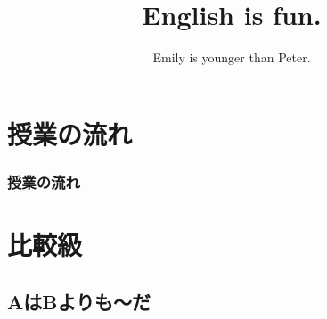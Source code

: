 \documentclass[aspectratio=169,xcolor={dvipsnames,table}]{beamer}
\title{English is fun.}
\subtitle{Emily is younger than Peter.}
\author{}
\institute[]{}
\date[]
\begin{document}
\begin{frame}[plain]
  \titlepage
\end{frame}

\section*{授業の流れ}
\begin{frame}[plain]
  \frametitle{授業の流れ}
  \tableofcontents
\end{frame}

\section{比較級}
\subsection{AはBよりも〜だ}
\end{document}
